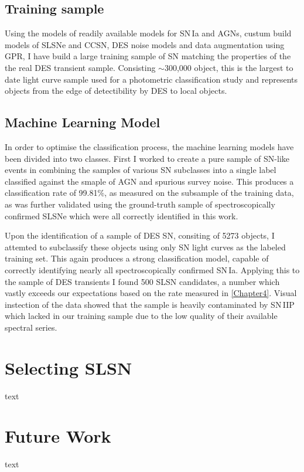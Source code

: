 \subsection{Training sample}
Using the models of readily available models for SN\,Ia and AGNs, custum build models of SLSNe and CCSN, DES noise models and data augmentation using GPR, I have build a large training sample of SN matching the properties of the the real DES transient sample. Consisting $\sim$300,000 object, this is the largest to date light curve sample used for a photometric classification study and represents objects from the edge of detectibility by DES to local objects.

\subsection{Machine Learning Model}
In order to optimise the classification process, the machine learning models have been divided into two classes. First I worked to create a pure sample of SN-like events in combining the samples of various SN subclasses into a single label classified against the smaple of AGN and spurious survey noise. This produces a classification rate of 99.81\%, as measured on the subsample of the training data, as was further validated using the ground-truth sample of spectroscopically confirmed SLSNe which were all correctly identified in this work.

Upon the identification of a sample of DES SN, consiting of 5273 objects, I attemted to subclassify these objects using only SN light curves as the labeled training set. This again produces a strong classification model, capable of correctly identifying nearly all spectroscopically confirmed SN\,Ia. Applying this to the sample of DES transients I found 500 SLSN candidates, a number which vastly exceeds our expectations based on the rate measured in \cref{Chapter4}. Visual instection of the data showed that the sample is heavily contaminated by SN\,IIP which lacked in our training sample due to the low quality of their available spectral series.

\section{Selecting SLSN}
text

\section{Future Work}
text

